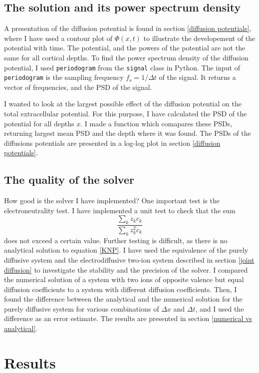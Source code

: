 \documentclass{article}
\begin{document}
\subsection{The solution and its power spectrum density}
A presentation of the diffusion potential is found in section \ref{diffusion potentials}, where I have used a contour plot of $\Phi(x,t)$ to illustrate the developement of the potential with time. The potential, and the powers of the potential are not the same for all cortical depths.
To find the power spectrum density of the diffusion potential, I used \texttt{periodogram}  from the \texttt{signal} class in Python. The input of \texttt{periodogram} is the sampling frequency $f_s = 1/\Delta t$ of the signal. It returns a vector of frequencies, and the PSD of the signal.

 I wanted to look at the largest possible effect of the diffusion potential on the total extracellular potential. For this purpose, I have calculated the PSD of the potential for all depths $x$. I made a function which comapares these PSDs, returning largest mean PSD and the depth where it was found. The PSDs of the diffusions potentials are presented in a log-log plot in section \ref{diffusion potentials}.

\subsection{The quality of the solver}
How good is the solver I have implemented? One important test is the electroneutrality test. I have implemented a unit test to check that the sum 
$$\frac{\sum_k z_k c_k}{\sum_k z_k^2 c_k}$$
does not exceed a certain value. Further testing is difficult, as there is no analytical solution to equation \ref{KNP}. I have used the equivalence of the purely diffusive system and the electrodiffusive two-ion system described in section \ref{joint diffusion} to investigate the stability and the precision of the solver. I compared the numerical solution of a system with two ions of opposite valence but equal diffusion coefficients to a system with different diffusion coefficients. 
Then, I found the difference between the analytical and the numerical solution for the purely diffusive system for various combinations of $\Delta x$ and $\Delta t$, and I used the difference as an error estimate. The results are presented in section \ref{numerical vs analytical}. 

\section{Results}
\end{document}
